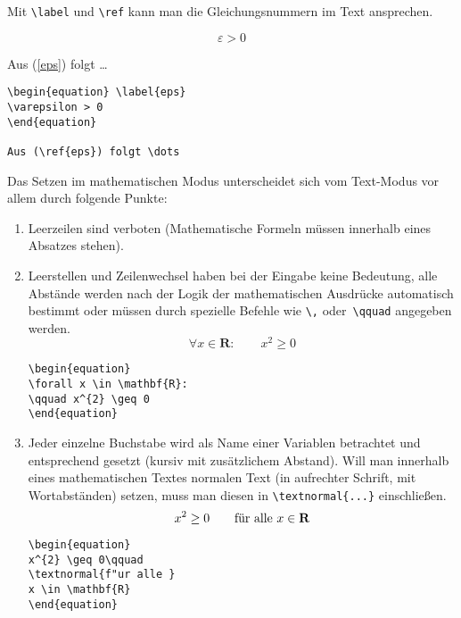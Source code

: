 Mit \verb|\label| und \verb|\ref| kann man die Gleichungsnummern
im Text ansprechen.

\exa
\begin{equation} \label{eps}
\varepsilon > 0
\end{equation}
 
Aus (\ref{eps}) folgt \dots
\exb
\begin{verbatim}
\begin{equation} \label{eps}
\varepsilon > 0
\end{equation}
 
Aus (\ref{eps}) folgt \dots
\end{verbatim}
\exc
 
 
 
Das Setzen im mathematischen Modus unterscheidet sich vom
Text-Modus vor allem durch folgende Punkte:
\begin{enumerate}
\item Leerzeilen sind verboten (Mathematische Formeln müssen
  innerhalb eines Absatzes stehen).

\item Leerstellen und Zeilenwechsel haben bei der Eingabe keine
  Bedeutung, alle Abstände werden nach der Logik der
  mathematischen Ausdrücke automatisch bestimmt oder müssen
  durch spezielle Befehle wie \verb|\,| oder~\verb|\qquad|
  angegeben werden.
\exa
\begin{equation}
\forall x \in \mathbf{R}:
\qquad x^{2} \geq 0
\end{equation}
\exb
\begin{verbatim}
\begin{equation}
\forall x \in \mathbf{R}:
\qquad x^{2} \geq 0
\end{equation}
\end{verbatim}
\exc
 
\item Jeder einzelne Buchstabe wird als Name einer Variablen
  betrachtet und entsprechend gesetzt (kursiv mit
  zusätzlichem Abstand).  Will man innerhalb eines
  mathematischen Textes normalen Text (in aufrechter Schrift, mit
  Wortabständen) setzen, muss man diesen in
  \verb|\textnormal{...}| einschließen.
\exa
\begin{equation}
x^{2} \geq 0\qquad
\textnormal{für alle }
x \in \mathbf{R}
\end{equation}
\exb
\begin{verbatim}
\begin{equation}
x^{2} \geq 0\qquad
\textnormal{f"ur alle }
x \in \mathbf{R}
\end{equation}
\end{verbatim}
\exc
 
 
\end{enumerate}
 
